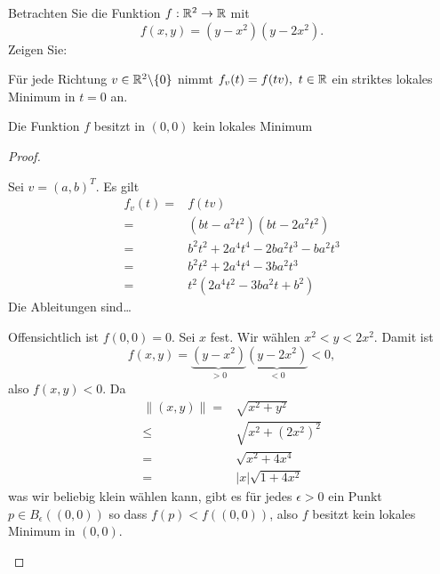 \begin{Problem}
	Betrachten Sie die Funktion $f:\mathbb{R}^2\to\mathbb{R}$ mit
	\[
	f(x,y)=(y-x^2)(y-2x^2)
	.\] 
	Zeigen Sie:
	\begin{parts}
	\item F\"{u}r jede Richtung $v\in \mathbb{R}^2\backslash \{0\} $ nimmt $f_v(t)=f(tv),~t\in \mathbb{R}$ ein striktes lokales Minimum in $t=0$ an.
	\item Die Funktion $f$ besitzt in $(0,0)$ kein lokales Minimum
	\end{parts}
\end{Problem}
\begin{proof}
\begin{parts}
\item Sei $v=(a,b)^T$. Es gilt 
	\begin{align*}
		f_v(t)=& f(tv)\\
		=&(bt-a^2t^2)(bt-2a^2t^2)\\
		=&b^2t^2+2a^4t^4-2ba^2t^3-ba^2t^3\\
		=&b^2t^2+2a^4t^4-3ba^2t^3\\
		=&t^2(2a^4t^2-3ba^2t+b^2)
	\end{align*}
	Die Ableitungen sind\ldots
\item Offensichtlich ist $f(0,0)=0$. Sei $ x$ fest. Wir wählen $x^2<y<2x^2$. Damit ist
	\[
		f(x,y)=\underbrace{(y-x^2)}_{>0}\underbrace{(y-2x^2)}_{<0}<0
	,\]
	also $f(x,y)<0$. Da
	\begin{align*}
		\|(x,y)\|=& \sqrt{x^2+y^2} \\
		\le& \sqrt{x^2+(2x^2)^2} \\
		=& \sqrt{x^2+4x^4} \\
		=& |x|\sqrt{1+4x^2} 
	\end{align*}
	was wir beliebig klein wählen kann, gibt es f\"{u}r jedes $\epsilon>0$ ein Punkt $p\in B_\epsilon((0,0))$ so dass $f(p)<f((0,0))$, also $f$ besitzt kein lokales Minimum in $(0,0)$.
\end{parts}
\end{proof}
